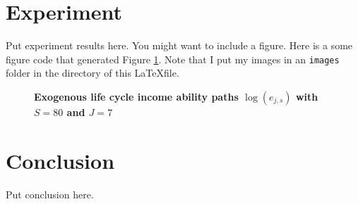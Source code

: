 \documentclass[letterpaper,12pt]{article}
\theoremstyle{definition}
\begin{document}
\begin{spacing}{1.5}{}
\section{Experiment}\label{SecExperiment}

  Put experiment results here. You might want to include a figure. Here is a some figure code that generated Figure \ref{FigLogAbility}. Note that I put my images in an \texttt{images} folder in the directory of this \LaTeX file.

  \begin{figure}[htb]\centering \captionsetup{width=4.0in}
    \caption{\label{FigLogAbility}\textbf{Exogenous life cycle income ability paths $\log(e_{j,s})$ with $S=80$ and $J=7$}}
  \end{figure}


\section{Conclusion}\label{SecConclusion}

  Put conclusion here.

  \clearpage


\end{spacing}


\newpage



\newpage
\renewcommand{\theequation}{A.\arabic{section}.\arabic{equation}}
\renewcommand{\thesection}{A-\arabic{section}}   %
\setcounter{equation}{0}                         %
\setcounter{section}{0}                          %
\end{document}
